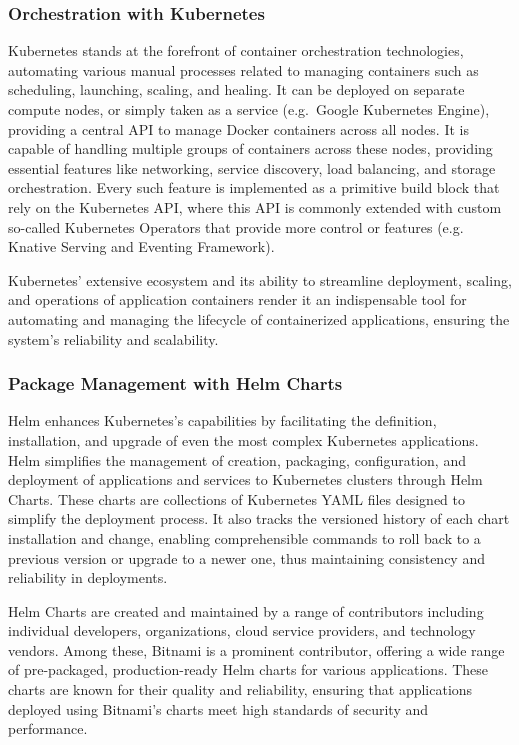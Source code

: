 \documentclass{report}
\begin{document}
    \subsubsection{Orchestration with Kubernetes}
    Kubernetes stands at the forefront of container orchestration technologies, automating various manual processes related to managing containers such as scheduling, launching, scaling, and healing. It can be deployed on separate compute nodes, or simply taken as a service (e.g.\ Google Kubernetes Engine), providing a central API to manage Docker containers across all nodes. It is capable of handling multiple groups of containers across these nodes, providing essential features like networking, service discovery, load balancing, and storage orchestration. Every such feature is implemented as a primitive build block that rely on the Kubernetes API, where this API is commonly extended with custom so-called Kubernetes Operators that provide more control or features (e.g. Knative Serving and Eventing Framework).

    Kubernetes' extensive ecosystem and its ability to streamline deployment, scaling, and operations of application containers render it an indispensable tool for automating and managing the lifecycle of containerized applications, ensuring the system's reliability and scalability.

    \subsubsection{Package Management with Helm Charts}
    Helm enhances Kubernetes's capabilities by facilitating the definition, installation, and upgrade of even the most complex Kubernetes applications. Helm simplifies the management of creation, packaging, configuration, and deployment of applications and services to Kubernetes clusters through Helm Charts. These charts are collections of Kubernetes YAML files designed to simplify the deployment process. It also tracks the versioned history of each chart installation and change, enabling comprehensible commands to roll back to a previous version or upgrade to a newer one, thus maintaining consistency and reliability in deployments.

    Helm Charts are created and maintained by a range of contributors including individual developers, organizations, cloud service providers, and technology vendors. Among these, Bitnami is a prominent contributor, offering a wide range of pre-packaged, production-ready Helm charts for various applications. These charts are known for their quality and reliability, ensuring that applications deployed using Bitnami's charts meet high standards of security and performance.
\end{document}
